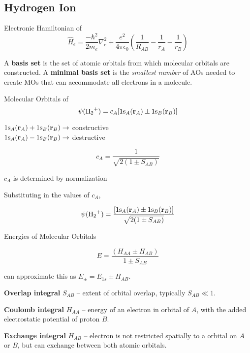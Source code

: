 \subsection*{Hydrogen Ion }

Electronic Hamiltonian of 
\begin{equation*}
    \hat{H}_e = \frac{-\hbar^2}{2m_e}\nabla^2_e + \frac{e^2}{4\pi\epsilon_0} \left( \frac{1}{R_{AB}} - \frac{1}{r_{A}} - \frac{1}{r_{B}} \right)
\end{equation*}

A \textbf{basis set} is the set of atomic orbitals from which molecular orbitals are constructed. A
\textbf{minimal basis set} is the \textit{smallest number} of AOs needed to create MOs that can
accommodate all electrons in a molecule.
\vspace{\baselineskip}

Molecular Orbitals of 
\begin{equation*}
    \psi(\ce{H2+}) = c_A[1\ce{s_}_A (\mathbf{r}_A) \pm 1\ce{s_}_B (\mathbf{r}_B)]
  \end{equation*}

$1\ce{s_}_A (\mathbf{r}_A) + 1\ce{s_}_B (\mathbf{r}_B) \rightarrow$ constructive \\
$1\ce{s_}_A (\mathbf{r}_A) - 1\ce{s_}_B (\mathbf{r}_B) \rightarrow$ destructive 

$$c_A = \frac{1}{\sqrt{2 (1 \pm S_{AB})}}$$

$c_A$ is determined by normalization

Substituting in the values of $c_A$,

$$\psi(\ce{H2+}) = \frac{[1\ce{s_}_A (\mathbf{r}_A) \pm 1\ce{s_}_B (\mathbf{r}_B)]}{\sqrt{2 (1 \pm S_{AB})}}$$

Energies of  Molecular Orbitals

$$E = \frac{(H_{AA} \pm H_{AB})}{1 \pm S_{AB}}$$

can approximate this as $E_{\pm} = E_{1s} \pm H_{AB}$.

\textbf{Overlap integral} $S_{AB}$ -- extent of orbital overlap, typically $S_{AB} \ll 1$.

\textbf{Coulomb integral} $H_{AA}$ -- energy of an electron in  orbital of $A$, with the added electrostatic potential of proton $B$.

\textbf{Exchange integral} $H_{AB}$ -- electron is not restricted spatially to a  orbital on $A$ or $B$,
but can exchange between both atomic orbitals.
\vspace{\baselineskip}

